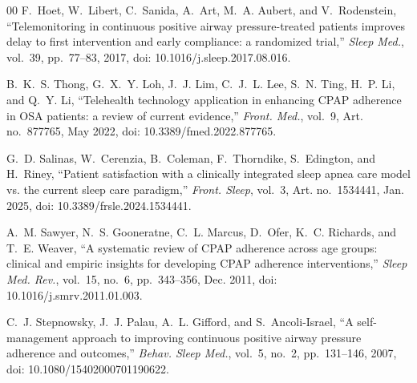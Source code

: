 \documentclass[conference]{IEEEtran}
\begin{document}
\begin{thebibliography}{00}
F.~Hoet, W.~Libert, C.~Sanida, A.~Art, M.~A. Aubert, and
V.~Rodenstein,
``Telemonitoring in continuous positive airway pressure-treated
patients improves delay to first intervention and early compliance:
a randomized trial,''
\textit{Sleep Med.}, vol.~39, pp.~77--83, 2017,
doi: 10.1016/j.sleep.2017.08.016.

B.~K.~S. Thong, G.~X.~Y. Loh, J.~J. Lim, C.~J.~L. Lee, S.~N. Ting,
H.~P. Li, and Q.~Y. Li,
``Telehealth technology application in enhancing CPAP adherence in
OSA patients: a review of current evidence,''
\textit{Front. Med.}, vol.~9, Art. no.~877765, May 2022,
doi: 10.3389/fmed.2022.877765.

G.~D. Salinas, W.~Cerenzia, B.~Coleman, F.~Thorndike, S.~Edington,
and H.~Riney,
``Patient satisfaction with a clinically integrated sleep apnea care
model vs. the current sleep care paradigm,''
\textit{Front. Sleep}, vol.~3, Art. no.~1534441, Jan. 2025,
doi: 10.3389/frsle.2024.1534441.

A.~M. Sawyer, N.~S. Gooneratne, C.~L. Marcus, D.~Ofer,
K.~C. Richards, and T.~E. Weaver,
``A systematic review of CPAP adherence across age groups: clinical
and empiric insights for developing CPAP adherence interventions,''
\textit{Sleep Med. Rev.}, vol.~15, no.~6, pp.~343--356, Dec. 2011,
doi: 10.1016/j.smrv.2011.01.003.

C.~J. Stepnowsky, J.~J. Palau, A.~L. Gifford, and S.~Ancoli-Israel,
``A self-management approach to improving continuous positive airway
pressure adherence and outcomes,''
\textit{Behav. Sleep Med.}, vol.~5, no.~2, pp.~131--146, 2007,
doi: 10.1080/15402000701190622.

\end{thebibliography}

\balance
\end{document}
